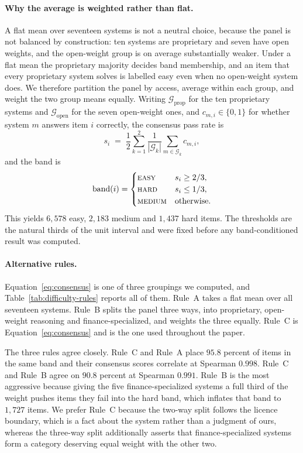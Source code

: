 \paragraph{Why the average is weighted rather than flat.}
A flat mean over seventeen systems is not a neutral choice, because the panel is not balanced by
construction: ten systems are proprietary and seven have open weights, and the open-weight group
is on average substantially weaker. Under a flat mean the proprietary majority decides band membership, and an
item that every proprietary system solves is labelled easy even when no open-weight system does.
We therefore partition the panel by access, average within each group, and weight the two
group means equally. Writing $\mathcal{G}_{\mathrm{prop}}$ for the ten proprietary systems and
$\mathcal{G}_{\mathrm{open}}$ for the seven open-weight ones, and $c_{m,i}\in\{0,1\}$ for whether system $m$ answers item
$i$ correctly, the consensus pass rate is
\begin{equation}
s_i \;=\; \frac{1}{2}\sum_{k=1}^{2}\frac{1}{|\mathcal{G}_k|}\sum_{m\in\mathcal{G}_k} c_{m,i},
\label{eq:consensus}
\end{equation}
and the band is
\begin{equation}
\mathrm{band}(i)=
\begin{cases}
\textsc{easy}   & s_i \geq 2/3,\\
\textsc{hard}   & s_i \leq 1/3,\\
\textsc{medium} & \text{otherwise.}
\end{cases}
\label{eq:band}
\end{equation}
This yields $6{,}578$ easy, $2{,}183$ medium and $1{,}437$ hard items. The thresholds are the
natural thirds of the unit interval and were fixed before any band-conditioned result was
computed.

\paragraph{Alternative rules.}
Equation~\ref{eq:consensus} is one of three groupings we computed, and
Table~\ref{tab:difficulty-rules} reports all of them. Rule~A takes a flat mean over all
seventeen systems. Rule~B splits the panel three ways, into proprietary, open-weight reasoning
and finance-specialized, and weights the three equally. Rule~C is
Equation~\ref{eq:consensus} and is the one used throughout the paper.

The three rules agree closely. Rule~C and Rule~A place $95.8$ percent of items in the same band
and their consensus scores correlate at Spearman $0.998$. Rule~C and Rule~B agree on $90.8$
percent at Spearman $0.991$. Rule~B is the most aggressive because giving the five
finance-specialized systems a full third of the weight pushes items they fail into the hard band,
which inflates that band to $1{,}727$ items. We prefer Rule~C because the two-way split follows the licence boundary, which is a fact about
the system rather than a judgment of ours, whereas the three-way split additionally asserts that
finance-specialized systems form a category deserving equal weight with the other two.

